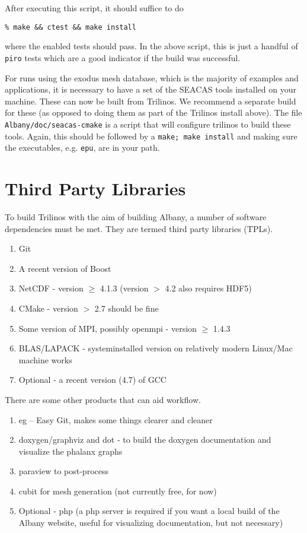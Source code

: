 \documentclass[pdf,12pt,report,strict]{SANDreport}
\theoremstyle{remark}
\begin{document}
After executing this script, it should suffice to do
\begin{verbatim}
% make && ctest && make install
\end{verbatim}
where the enabled tests should pass. In the above script, this is
just a handful of \texttt{piro} tests which are a good indicator
if the build was successful.

For runs using the exodus mesh database, which is the majority of
examples and applications, it is necessary to have a set of the
SEACAS tools installed on your machine. These can now be built
from Trilinos. We recommend a separate build for these (as opposed
to doing them as part of the Trilinos install above). The file 
\texttt{Albany/doc/seacas-cmake} is a script that will configure 
trilinos to build these tools.  Again, this should be followed
by a  \texttt{make; make install} and making sure the executables,
e.g. \texttt{epu}, are in your path.


\section{Third Party Libraries}

To build Trilinos with the aim of building Albany, a number of
software dependencies must be met. They are termed third party
libraries (TPLs). 
\begin{enumerate}
\item Git
\item A recent version of Boost
\item NetCDF - version $\ge$ 4.1.3 (version $>$ 4.2 also requires
  HDF5)
\item CMake - version $>$ 2.7 should be fine
\item Some version of MPI, possibly openmpi - version $\ge$ 1.4.3
\item BLAS/LAPACK - systeminstalled version on relatively modern
  Linux/Mac machine works
\item Optional - a recent version (4.7) of GCC
\end{enumerate}
There are some other products that can aid workflow.
\begin{enumerate}
\item eg -- Easy Git, makes some things clearer and cleaner
\item doxygen/graphviz and dot - to build the doxygen documentation
  and visualize the phalanx graphs
\item paraview to post-process
\item cubit for mesh generation (not currently free, for now)
\item Optional - php (a php server is required if you want a local
  build of the Albany website, useful for visualizing documentation,
  but not necessary)
\end{enumerate}
\end{document}
